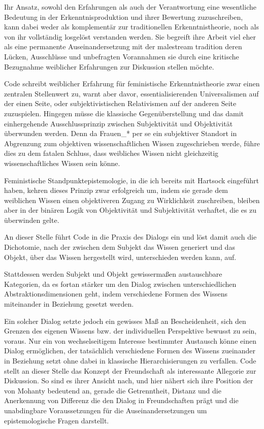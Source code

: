 Ihr Ansatz, sowohl den Erfahrungen als auch der Verantwortung eine wesentliche
Bedeutung in der Erkenntnisproduktion und ihrer Bewertung zuzuschreiben, kann
dabei weder als komplementär zur traditionellen Erkenntnistheorie, noch als von
ihr vollständig losgelöst verstanden werden. Sie begreift ihre Arbeit viel eher
als eine permanente Auseinandersetzung mit der malestream tradition deren
Lücken, Ausschlüsse und unbefragten Vorannahmen sie durch eine kritische
Bezugnahme weiblicher Erfahrungen zur Diskussion stellen möchte.\footnotemark
{}

Code schreibt weiblicher Erfahrung für feministische Erkenntnistheorie zwar
einen zentralen Stellenwert zu, warnt aber davor, essentialisierenden
Universalismen auf der einen Seite, oder subjektivistischen Relativismen auf der
anderen Seite zuzuspielen. Hingegen müsse die klassische Gegenüberstellung und
das damit einhergehende Ausschlussprinzip zwischen Subjektivität und
Objektivität überwunden werden. Denn da Frauen\_* per se ein subjektiver
Standort in Abgrenzung zum objektiven wissenschaftlichen Wissen zugeschrieben
werde, führe dies zu dem fatalen Schluss, dass weibliches Wissen nicht
gleichzeitig wissenschaftliches Wissen sein könne.\footnotemark
{} 

Feministische Standpunktepistemologie, in die ich bereits mit Hartsock eingeführt haben, kehren dieses Prinzip zwar erfolgreich um, indem sie gerade dem weiblichen Wissen einen objektiveren Zugang zu Wirklichkeit zuschreiben, bleiben aber in der binären Logik von Objektivität und Subjektivität verhaftet, die es zu überwinden gelte.

An dieser Stelle führt Code in die Praxis des Dialogs ein und löst damit auch die Dichotomie, nach der zwischen dem Subjekt das Wissen generiert und das Objekt, über das Wissen hergestellt wird, unterschieden werden kann, auf.

Stattdessen werden Subjekt und Objekt gewissermaßen austauschbare Kategorien, da
es fortan stärker um den Dialog zwischen unterschiedlichen
Abstraktionsdimensionen geht, indem verschiedene Formen des Wissens miteinander
in Beziehung gesetzt werden.\footnotemark {} 

Ein solcher Dialog setzte jedoch ein gewisses Maß an Bescheidenheit, sich den
Grenzen des eigenen Wissens bzw. der individuellen Perspektive bewusst zu sein,
voraus. Nur ein von wechselseitigem Interesse bestimmter Austausch könne einen
Dialog ermöglichen, der tatsächlich verschiedene Formen des Wissens zueinander
in Beziehung setzt ohne dabei in klassische Hierarchisierungen zu verfallen.
Code stellt an dieser Stelle das Konzept der Freundschaft als interessante
Allegorie zur Diskussion. So sind es ihrer Ansicht nach, und hier nähert sich
ihre Position der von Mohanty bedeutend an, gerade die Getrenntheit, Distanz und
die Anerkennung von Differenz die den Dialog in Freundschaften prägt und die
unabdingbare Voraussetzungen für die Auseinandersetzungen um epistemologische
Fragen darstellt.\footnotemark {}

